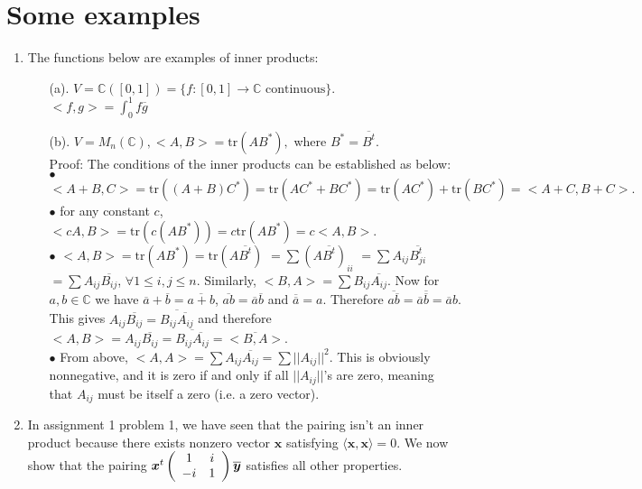\documentclass[11pt]{article}
\newcommand{\bbC}{\mathbb C}
\newcommand{\tr}{\mathrm{tr}}
\newcommand{\ol}{\overline}
\begin{document}
\section{Some examples}
\begin{enumerate}
\item The functions below are examples of inner products:
\begin{itemize}
\item [(a).] $V=\bbC ([0, 1])=\{f: [0,1]\to \bbC \text{ continuous}\}.$\\
$<f, g>=\int_0^1 f\ol{g}$
\item [(b).] $V=M_n(\bbC), <A, B>=\tr(AB^*), $ where $B^*=\ol{B^t}$.\\
Proof: The conditions of the inner products can be established as below: \\
$\bullet$ $<A+B, C>=\tr((A+B)C^*)=\tr(AC^*+BC^*)=\tr(AC^*)+\tr(BC^*)=<A+C, B+C>.$\\
$\bullet$ for any constant $c$, 
$<cA, B>=\tr(c(AB^*))=c\tr(AB^*)=c<A, B>$. \\
$\bullet$ $<A, B>=\tr(AB^*)=\tr(A\ol{B^t})$
$=\sum (A\ol{B^t})_{ii}$
$=\sum A_{ij}\ol{B^t_{ji}}$
$=\sum A_{ij}\ol{B_{ij}}$, $\forall 1\le i, j\le n$. 
Similarly, $<B, A>=\sum B_{ij}\ol{A_{ij}}.$
Now for $a, b\in\bbC$ we have $\ol{a}+\ol{b}=\ol{a+b}$, $\ol{ab}=\ol{a}\ol{b}$ and $\ol{\ol{a}}=a$. 
Therefore $\ol{a\ol{b}}=\ol{a}\ol{\ol{b}}=\ol{a}b$. 
This gives $A_{ij}\ol{B_{ij}}=\ol{ B_{ij}\ol{A_{ij}}}$ and therefore $<A, B>=A_{ij}\ol{B_{ij}}=\ol{ B_{ij}\ol{A_{ij}}}=\ol{<B,A>}$. \\
$\bullet$ From above, $<A, A>=\sum{A_{ij}\ol{A_{ij}}}=\sum ||A_{ij}||^2.$ This is obviously nonnegative, and it is zero if and only if all $||A_{ij}||$'s are zero, meaning that $A_{ij}$ must be itself a zero (i.e. a zero vector). 
\end{itemize} 

\item In assignment 1 problem 1, we have seen that the pairing isn't an inner product because there exists nonzero vector $\bm{x}$ satisfying $\langle \bm{x}, \bm{x}\rangle =0$. We now show that the pairing $\bm{x}^t\left(\begin{array}{c c}1 & i\\-i & 1\end{array}\right)\ol{\bm{y}}$ satisfies all other properties. 


\end{enumerate}
\end{document}

